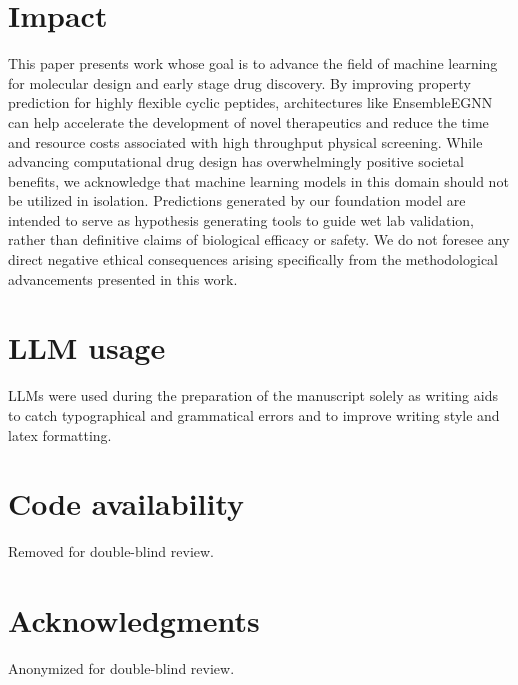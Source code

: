 \documentclass{article}
\begin{document}
\clearpage
\section*{Impact}

This paper presents work whose goal is to advance the field of machine learning for molecular design and early stage drug discovery. By improving property prediction for highly flexible cyclic peptides, architectures like EnsembleEGNN can help accelerate the development of novel therapeutics and reduce the time and resource costs associated with high throughput physical screening. While advancing computational drug design has overwhelmingly positive societal benefits, we acknowledge that machine learning models in this domain should not be utilized in isolation. Predictions generated by our foundation model are intended to serve as hypothesis generating tools to guide wet lab validation, rather than definitive claims of biological efficacy or safety. We do not foresee any direct negative ethical consequences arising specifically from the methodological advancements presented in this work.

\section*{LLM usage}
LLMs were used during the preparation of the manuscript solely as writing aids to catch typographical and grammatical errors and to improve writing style and latex formatting.

\section*{Code availability}
Removed for double-blind review.

\section*{Acknowledgments}

Anonymized for double-blind review.



\clearpage
\setcounter{table}{0}
\renewcommand{\thetable}{S\arabic{table}}
\end{document}
